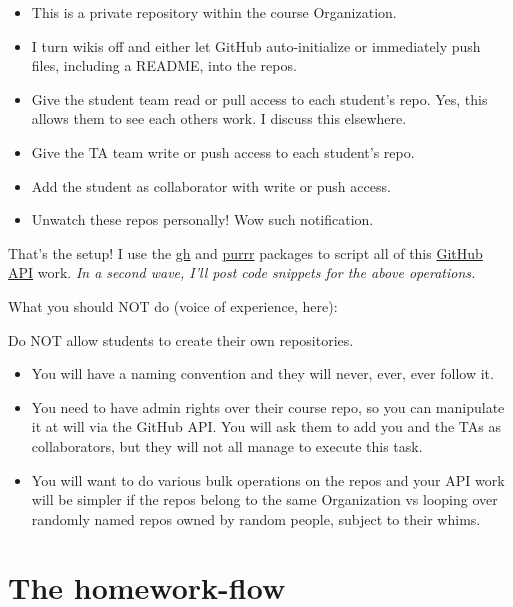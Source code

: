 \documentclass[
]{book}
\providecommand{\tightlist}{%
  \setlength{\itemsep}{0pt}\setlength{\parskip}{0pt}}
\begin{document}
\begin{itemize}
  \begin{itemize}
  \tightlist
  \item
    This is a private repository within the course Organization.
  \item
    I turn wikis off and either let GitHub auto-initialize or immediately push files, including a README, into the repos.
  \item
    Give the student team read or pull access to each student's repo. Yes, this allows them to see each others work. I discuss this elsewhere.
  \item
    Give the TA team write or push access to each student's repo.
  \item
    Add the student as collaborator with write or push access.
  \item
    Unwatch these repos personally! Wow such notification.
  \end{itemize}
\end{itemize}

That's the setup! I use the \href{https://github.com/gaborcsardi/gh}{gh} and \href{https://github.com/hadley/purrr}{purrr} packages to script all of this \href{https://developer.github.com/v3/}{GitHub API} work. \emph{In a second wave, I'll post code snippets for the above operations.}

What you should NOT do (voice of experience, here):

Do NOT allow students to create their own repositories.

\begin{itemize}
\tightlist
\item
  You will have a naming convention and they will never, ever, ever follow it.
\item
  You need to have admin rights over their course repo, so you can manipulate it at will via the GitHub API. You will ask them to add you and the TAs as collaborators, but they will not all manage to execute this task.
\item
  You will want to do various bulk operations on the repos and your API work will be simpler if the repos belong to the same Organization vs looping over randomly named repos owned by random people, subject to their whims.
\end{itemize}

\section{The homework-flow}\label{the-homework-flow}
\end{document}
